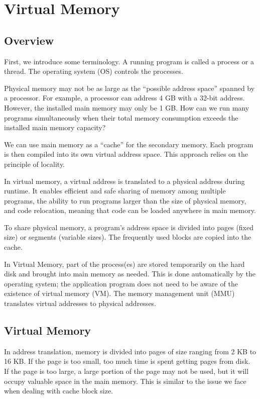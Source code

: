\chapter{Virtual Memory}

\section{Overview}
First, we introduce some terminology. A running program is called a process or a thread. The operating system (OS) controls the processes.

Physical memory may not be as large as the ``possible address space'' spanned by a processor. For example, a processor can address 4 GB with a 32-bit address. However, the installed main memory may only be 1 GB. How can we run many programs simultaneously when their total memory consumption exceeds the installed main memory capacity?

We can use main memory as a ``cache'' for the secondary memory. Each program is then compiled into its own virtual address space. This approach relies on the principle of locality.

In virtual memory, a virtual address is translated to a physical address during runtime. It enables efficient and safe sharing of memory among multiple programs, the ability to run programs larger than the size of physical memory, and code relocation, meaning that code can be loaded anywhere in main memory.

To share physical memory, a program's address space is divided into pages (fixed size) or segments (variable sizes). The frequently used blocks are copied into the cache.

In Virtual Memory, part of the process(es) are stored temporarily on the hard disk and brought into main memory as needed. This is done automatically by the operating system; the application program does not need to be aware of the existence of virtual memory (VM). The memory management unit (MMU) translates virtual addresses to physical addresses.

\section{Virtual Memory}
In address translation, memory is divided into pages of size ranging from 2 KB to 16 KB. If the page is too small, too much time is spent getting pages from disk. If the page is too large, a large portion of the page may not be used, but it will occupy valuable space in the main memory. This is similar to the issue we face when dealing with cache block size. 

